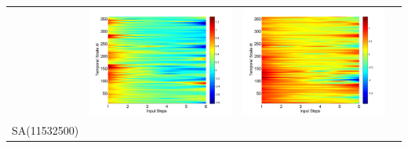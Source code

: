 \documentclass[review]{elsarticle}
\begin{document}
\begin{table}[H]
\begin{tabular}{cccc}
&\begin{minipage}{.3\textwidth}\includegraphics[width=\linewidth]{resultgraph/05585000epdiff_former.png}\end{minipage}
&\begin{minipage}{.3\textwidth}\includegraphics[width=\linewidth]{resultgraph/05585000qdiff_former.png}\end{minipage}
\\
SA(11532500)

\end{tabular}
\end{table}
\end{document}
